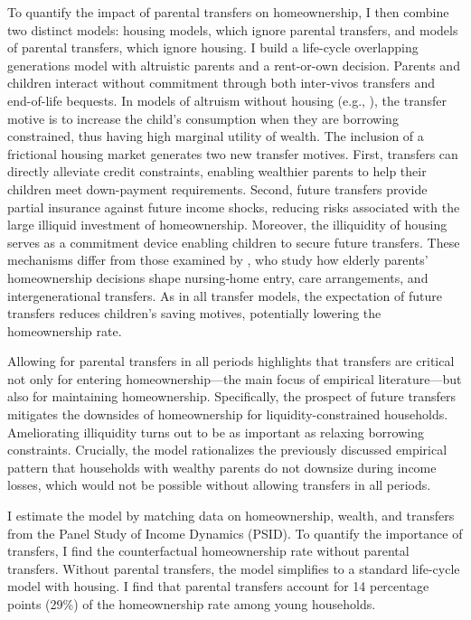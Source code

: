 \documentclass[12pt]{article}
\begin{document}
To quantify the impact of parental transfers on homeownership, I then combine two distinct models: housing models, which ignore parental transfers, and models of parental transfers, which ignore housing. I build a life-cycle overlapping generations model with altruistic parents and a rent-or-own decision. Parents and children interact without commitment through both inter-vivos transfers and end-of-life bequests. In models of altruism without housing (e.g., \citealp{Altonji1997a,Barczyk2014}), the transfer motive is to increase the child's consumption when they are borrowing constrained, thus having high marginal utility of wealth. The inclusion of a frictional housing market generates two new transfer motives. First, transfers can directly alleviate credit constraints, enabling wealthier parents to help their children meet down-payment requirements. Second, future transfers provide partial insurance against future income shocks, reducing risks associated with the large illiquid investment of homeownership. Moreover, the illiquidity of housing serves as a commitment device enabling children to secure future transfers. These mechanisms differ from those examined by \citet{Barczyk2020a}, who study how elderly parents’ homeownership decisions shape nursing‑home entry, care arrangements, and intergenerational transfers. As in all transfer models, the expectation of future transfers reduces children's saving motives, potentially lowering the homeownership rate.

Allowing for parental transfers in all periods highlights that transfers are critical not only for entering homeownership---the main focus of empirical literature---but also for maintaining homeownership. Specifically, the prospect of future transfers mitigates the downsides of homeownership for liquidity-constrained households. Ameliorating illiquidity turns out to be as important as relaxing borrowing constraints. Crucially, the model rationalizes the previously discussed empirical pattern that households with wealthy parents do not downsize during income losses, which would not be possible without allowing transfers in all periods. 

I estimate the model by matching data on homeownership, wealth, and transfers from the Panel Study of Income Dynamics (PSID). To quantify the importance of transfers, I find the counterfactual homeownership rate without parental transfers. Without parental transfers, the model simplifies to a standard life-cycle model with housing. I find that parental transfers account for 14 percentage points (29\%) of the homeownership rate among young households. 
\end{document}

